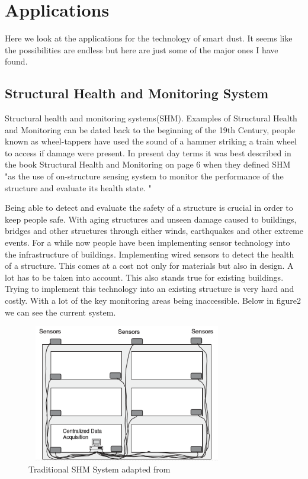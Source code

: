 \documentclass[article]{IEEEtran}
\begin{document}
\section{Applications}
Here we look at the applications for the technology of smart dust. It seems like the possibilities are endless but here are just some of the major ones I have found.

\subsection{Structural Health and Monitoring System}
Structural health and monitoring systems(SHM). Examples of Structural Health and Monitoring can be dated back to the beginning of the 19th Century, people known as wheel-tappers have used the sound of a hammer striking a train wheel to access if damage were present. In present day terms it was best described in the book Structural Health and Monitoring on page 6 when they defined SHM "as the use of on-structure sensing system to monitor the performance   of   the   structure   and   evaluate   its   health   state. "\cite{SHM}

Being able to detect and evaluate the safety of a structure is crucial in order to keep people safe. With aging structures and unseen damage caused to buildings, bridges and other structures through either winds, earthquakes and other extreme events. For a while now people have been implementing sensor technology into the infrastructure of buildings. Implementing wired sensors to detect the health of a structure. This comes at a cost not only for materials but also in design. A lot has to be taken into account. This also stands true for existing buildings. Trying to implement this technology into an existing structure is very hard and costly. With a lot of the key monitoring areas being inaccessible. Below in figure2 we can see the current system.

\begin{figure}[h!]
\graphicspath{ {images/} }
\includegraphics[width=8.8cm, height=6cm]{figure2}
\caption{Traditional SHM System adapted from \cite{SHM}}
\label{Tradition SHM}
\end{figure}
\end{document}
